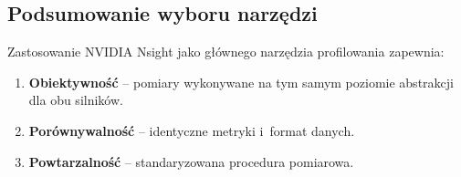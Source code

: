 \subsection{Podsumowanie wyboru narzędzi}
\label{subsec:podsumowanie-narzedzi}

Zastosowanie NVIDIA Nsight jako głównego narzędzia profilowania zapewnia:

\begin{enumerate}
    \item \textbf{Obiektywność} -- pomiary wykonywane na tym samym poziomie abstrakcji dla obu silników.
    \item \textbf{Porównywalność} -- identyczne metryki i~format danych.
    \item \textbf{Powtarzalność} -- standaryzowana procedura pomiarowa.
\end{enumerate}

